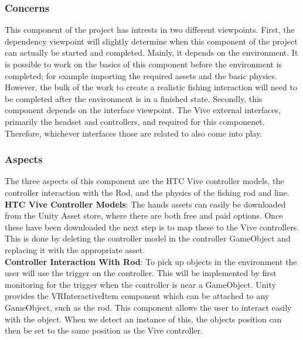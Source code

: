 \documentclass[10pt,journal,compsoc,onecolumn, draftclsnofoot]{IEEEtran}
\begin{document}
\subsubsection{Concerns}
This component of the project has intrests in two different viewpoints.
First, the dependency viewpoint will slightly determine when this component of the project can actually be started and completed.
Mainly, it depends on the environment.
It is possible to work on the basics of this component before the environment is completed; for example importing the required assets and the basic physics.
However, the bulk of the work to create a realistic fishing interaction will need to be completed after the environment is in a finished state.
Secondly, this component depends on the interface viewpoint.
The Vive external interfaces, primarily the headset and controllers, and required for this componenet.
Therefore, whichever interfaces those are related to also come into play.

\subsubsection{Aspects}
The three aspects of this component are the HTC Vive controller models, the controller interaction with the Rod, and the physics of the fishing rod and line.\\

\hangindent=0.5cm \textbf{HTC Vive Controller Models}: The hands assets can easily be downloaded from the Unity Asset store, where there are both free and paid options.
Once these have been downloaded the next step is to map these to the Vive controllers.
This is done by deleting the controller model in the controller GameObject and replacing it with the appropriate asset.\\

\hangindent=0.5cm \textbf{Controller Interaction With Rod}: To pick up objects in the environment the user will use the trigger on the controller.
This will be implemented by first monitoring for the trigger when the controller is near a GameObject.
Unity provides the VRInteractiveItem component which can be attached to any GameObject, such as the rod.\cite{unity_controller_interaction}
This component allows the user to interact easily with the object.
When we detect an instance of this, the objects position can then be set to the same position as the Vive controller.\\
\end{document}
